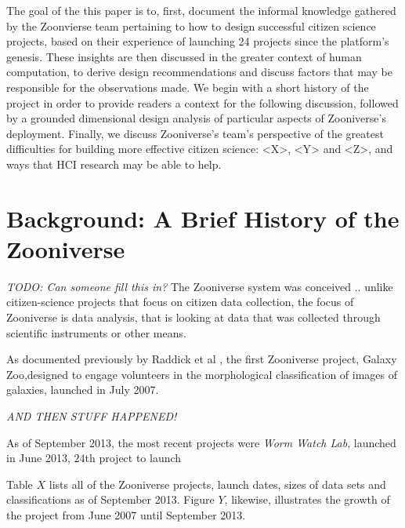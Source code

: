 \documentclass{sigchi}
\begin{document}
The goal of the this paper is to, first, document the informal
knowledge gathered by the Zoonvierse team pertaining to how to design
successful citizen science projects, based on their experience of
launching 24 projects since the platform's genesis.  These insights
are then discussed in the greater context of human computation, to
derive design recommendations and discuss factors that may be
responsible for the observations made. We begin with a short history
of the project in order to provide readers a context for the following
discussion, followed by a grounded dimensional design analysis of
particular aspects of Zooniverse's deployment.  Finally, we discuss 
Zooniverse's team's perspective of the greatest difficulties for
building more effective citizen science: <X>, <Y> and <Z>, and
ways that HCI research may be able to help.

\section{Background: A Brief History of the Zooniverse}

\emph{TODO: Can someone fill this in?}  The Zooniverse system was
conceived .. \cite{fortson2011galaxy} unlike citizen-science projects
that focus on citizen data collection, the focus of Zooniverse is data
analysis, that is looking at data that was collected through
scientific instruments or other means.
% 

As documented previously by Raddick et al \cite{raddick}, the first
Zooniverse project, Galaxy Zoo,designed to engage volunteers in the
morphological classification of images of galaxies, launched in July
2007\cite{galaxyzoo-launch}. 

\emph{AND THEN STUFF HAPPENED!}  

As of September 2013, the most recent projects were \emph{Worm Watch
  Lab}, launched in June 2013, $24$th project to launch

Table $X$ lists all of the Zooniverse projects, launch dates, sizes of
data sets and classifications as of September 2013.  Figure $Y$,
likewise, illustrates the growth of the project from June 2007 until
September 2013.

\end{document}
